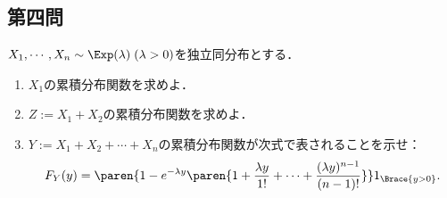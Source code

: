 \documentclass[uplatex,dvipdfmx]{jsarticle}
\begin{document}
\subsection{第四問}

\begin{tcolorbox}[colframe=ForestGreen, colback=ForestGreen!10!white,breakable,colbacktitle=ForestGreen!40!white,coltitle=black,fonttitle=\bfseries\sffamily,
    title=第４問]
    \begin{problem}\label{prob-17-8-4}
        $X_1,\cdots,X_n\sim\Exp(\lambda)\;(\lambda>0)$を独立同分布とする．
        \begin{enumerate}[{問}1]
            \item $X_1$の累積分布関数を求めよ．
            \item $Z:=X_1+X_2$の累積分布関数を求めよ．
            \item $Y:=X_1+X_2+\cdots+X_n$の累積分布関数が次式で表されることを示せ：
            \[F_Y(y)=\paren{1-e^{-\lambda y}\paren{1+\frac{\lambda y}{1!}+\cdots+\frac{(\lambda y)^{n-1}}{(n-1)!}}}1_{\Brace{y>0}}.\]
        \end{enumerate}
    \end{problem}
\end{tcolorbox}
\end{document}
